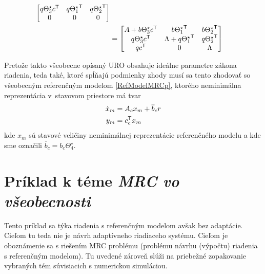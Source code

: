 \documentclass[a4paper, 10pt, ]{article}
\begin{document}
\begin{equation}
\begin{split}
\begin{bmatrix}
			q \Theta_3^\star c^{\mathsf{T}} & q {\Theta_1^\star}^{\mathsf{T}} & q {\Theta_2^\star}^{\mathsf{T}} \\
			0 & 0 & 0
		\end{bmatrix} \\
		&=
		\begin{bmatrix}
             A +  b \Theta_3^\star c^{\mathsf{T}}&
	    	 b {\Theta_1^\star}^{\mathsf{T}} &
	    	 b {\Theta_2^\star}^{\mathsf{T}} \\
	    	 q \Theta_3^\star c^{\mathsf{T}} &
	    	 \Lambda + q {\Theta_1^\star}^{\mathsf{T}} &
	    	 q {\Theta_2^\star}^{\mathsf{T}} \\
	    	 q c^{\mathsf{T}} & 0 & \Lambda
	 	\end{bmatrix}
	\end{split}
\end{equation}

Pretože takto všeobecne opísaný URO obsahuje ideálne parametre zákona riadenia, teda také, ktoré spĺňajú podmienky zhody musí sa tento zhodovať so všeobecným referenčným modelom \eqref{RefModelMRCp}, ktorého neminimálna reprezentácia v~stavovom priestore má tvar
\begin{subequations} \label{vsNeminimalRMMRCp}
	\begin{align}
		\dot x_m &= A_c x_m + \overline{b}_c r \\
		y_m &= c_c^{\mathsf{T}} x_m
	\end{align}
\end{subequations}
kde $x_m$ sú stavové veličiny neminimálnej reprezentácie referenčného modelu a kde sme označili $\overline{b}_c = b_c \Theta_4^\star$.































\section{Príklad k téme \emph{MRC vo všeobecnosti}}
\label{pkTMRC}



Tento príklad sa týka riadenia s referenčným modelom avšak bez adaptácie. Cieľom tu teda nie je návrh adaptívneho riadiaceho systému. Cieľom je oboznámenie sa s riešením MRC problému (problému návrhu (výpočtu) riadenia s referenčným modelom). Tu uvedené zároveň slúži na priebežné zopakovanie vybraných tém súvisiacich s numerickou simuláciou.
\end{document}

